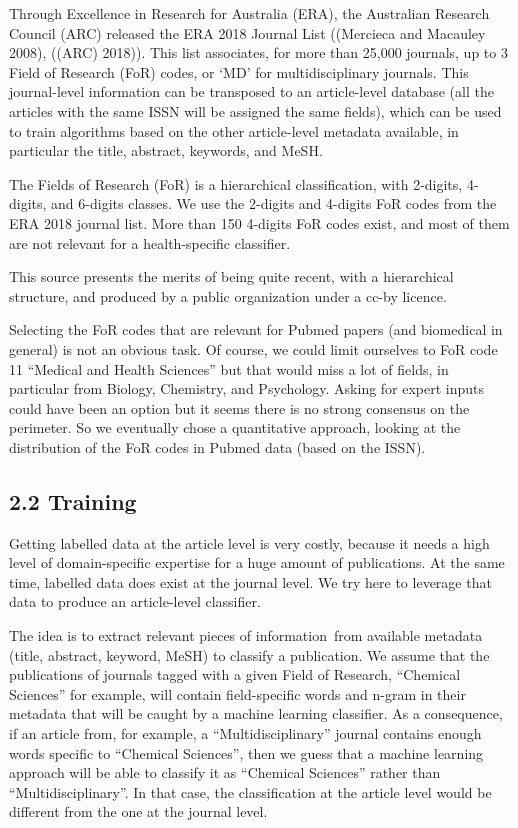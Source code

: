 \documentclass[
]{article}
\begin{document}
Through Excellence in Research for Australia (ERA), the Australian
Research Council (ARC) released the ERA 2018 Journal List ((Mercieca and
Macauley 2008), ((ARC) 2018)). This list associates, for more than
25,000 journals, up to 3 Field of Research (FoR) codes, or `MD' for
multidisciplinary journals. This journal-level information can be
transposed to an article-level database (all the articles with the same
ISSN will be assigned the same fields), which can be used to train
algorithms based on the other article-level metadata available, in
particular the title, abstract, keywords, and MeSH.

The Fields of Research (FoR) is a hierarchical classification, with
2-digits, 4-digits, and 6-digits classes. We use the 2-digits and
4-digits FoR codes from the ERA 2018 journal list. More than 150
4-digits FoR codes exist, and most of them are not relevant for a
health-specific classifier. ~

This source presents the merits of being quite recent, with a
hierarchical structure, and produced by a public organization under a
cc-by licence.

Selecting the FoR codes that are relevant for Pubmed papers (and
biomedical in general) is not an obvious task. Of course, we could limit
ourselves to FoR code 11 ``Medical and Health Sciences'' but that would
miss a lot of fields, in particular from Biology, Chemistry, and
Psychology. Asking for expert inputs could have been an option but it
seems there is no strong consensus on the perimeter. So we eventually
chose a quantitative approach, looking at the distribution of the FoR
codes in Pubmed data (based on the ISSN).

\hypertarget{training}{%
\subsection{2.2 Training}\label{training}}

Getting labelled data at the article level is very costly, because it
needs a high level of domain-specific expertise for a huge amount of
publications. At the same time, labelled data does exist at the journal
level. We try here to leverage that data to produce an article-level
classifier.

The idea is to extract relevant pieces of information~from available
metadata (title, abstract, keyword, MeSH) to classify a publication. We
assume that the publications of journals tagged with a given Field of
Research, ``Chemical Sciences'' for example, will contain field-specific
words and n-gram in their metadata that will be caught by a machine
learning classifier. As a consequence, if an article from, for example,
a ``Multidisciplinary'' journal contains enough words specific to
``Chemical Sciences'', then we guess that a machine learning approach
will be able to classify it as ``Chemical Sciences'' rather than
``Multidisciplinary''. In that case, the classification at the article
level would be different from the one at the journal level.
\end{document}
